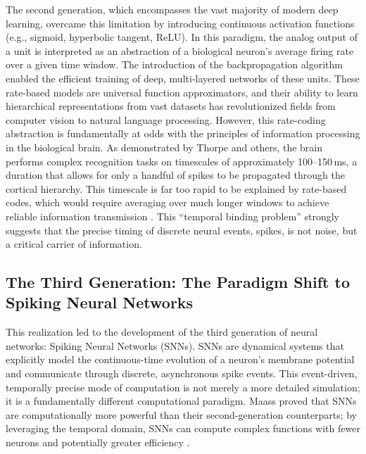 The second generation, which encompasses the vast majority of modern deep learning, overcame this limitation by introducing continuous activation functions (e.g., sigmoid, hyperbolic tangent, ReLU). In this paradigm, the analog output of a unit is interpreted as an abstraction of a biological neuron's average firing rate over a given time window. The introduction of the backpropagation algorithm enabled the efficient training of deep, multi-layered networks of these units. These rate-based models are universal function approximators, and their ability to learn hierarchical representations from vast datasets has revolutionized fields from computer vision to natural language processing. However, this rate-coding abstraction is fundamentally at odds with the principles of information processing in the biological brain. As demonstrated by Thorpe and others, the brain performs complex recognition tasks on timescales of approximately 100--150\,ms, a duration that allows for only a handful of spikes to be propagated through the cortical hierarchy. This timescale is far too rapid to be explained by rate-based codes, which would require averaging over much longer windows to achieve reliable information transmission \cite{simon_j_thorpe_biological_1989}. This ``temporal binding problem'' strongly suggests that the precise timing of discrete neural events, spikes, is not noise, but a critical carrier of information.

\subsection{The Third Generation: The Paradigm Shift to Spiking Neural Networks}
This realization led to the development of the third generation of neural networks: Spiking Neural Networks (SNNs). SNNs are dynamical systems that explicitly model the continuous-time evolution of a neuron's membrane potential and communicate through discrete, asynchronous spike events. This event-driven, temporally precise mode of computation is not merely a more detailed simulation; it is a fundamentally different computational paradigm. Maass proved that SNNs are computationally more powerful than their second-generation counterparts; by leveraging the temporal domain, SNNs can compute complex functions with fewer neurons and potentially greater efficiency \cite{maass_networks_1997}.

